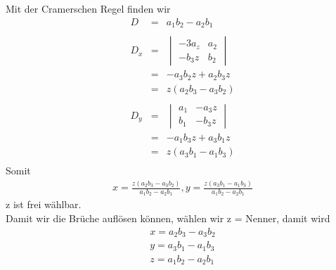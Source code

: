 Mit der Cramerschen Regel finden wir\\
\begin{eqnarray*}
D &=& a_1b_2-a_2b_1 \\
\\
D_x &= &\begin{vmatrix}-3a_z &  a_2 \\ 
	-b_3z & b_2 \end{vmatrix} \\
&=& -a_3b_2z + a_2b_3z \\
&=& z(a_2b_3 -a_3b_2)\\
\\
D_y &= &\begin{vmatrix}a_1 &  -a_3z \\ 
	b_1 & -b_3z \end{vmatrix} \\
&=& -a_1b_3z + a_3b_1z \\
&=& z(a_3b_1 -a_1b_3)\\
\end{eqnarray*}
Somit
\begin{eqnarray*}
	x = \frac{z(a_2b_3-a_3b_2)}{a_1b_2-a_2b_1}, y = \frac{z(a_3b_1-a_1b_3)}{a_1b_2 -a_2b_1}
\end{eqnarray*}
z ist frei wählbar.\\
Damit wir die Brüche auflösen können, wählen wir z = Nenner, damit wird
\begin{eqnarray*}
	x = a_2b_3 - a_3b_2\\
	y = a_3b_1 - a_1b_3 \\
	z = a_1b_2 - a_2b_1\\
\end{eqnarray*}

